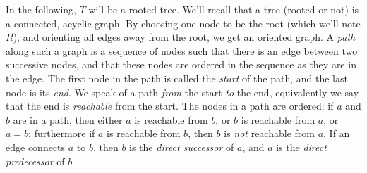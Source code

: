 \documentclass[a4paper,10pt]{report}
\theoremstyle{definition}
\begin{document}
In the following, $T$ will be a rooted tree. We'll recall that a tree (rooted or not) is a connected, acyclic graph. By choosing one node to be the root (which we'll note $R$), and orienting all edges away from the root, we get an oriented graph. A \textit{path} along such a graph is a sequence of nodes such that there is an edge between two successive nodes, and that these nodes are ordered in the sequence as they are in the edge. The first node in the path is called the \textit{start} of the path, and the last node is its \textit{end}. We speak of a path \textit{from} the start \textit{to} the end, equivalently we say that the end is \textit{reachable} from the start. The nodes in a path are ordered: if $a$ and $b$ are in a path, then either $a$ is reachable from $b$, or $b$ is reachable from $a$, or $a = b$; furthermore if $a$ is reachable from $b$, then $b$ is \textit{not} reachable from $a$. If an edge connects $a$ to $b$, then $b$ is the \textit{direct successor} of $a$, and $a$ is the \textit{direct predecessor} of $b$
\end{document}

